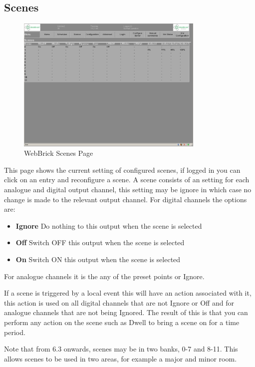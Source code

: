 \subsection{Scenes}
\begin{figure}[H]
\centering
\includegraphics[width=0.8\textwidth]{Images/Scenes.png}
\caption{WebBrick Scenes Page}
\end{figure}

This page shows the current setting of configured scenes, if logged in you can click on an entry and reconfigure a scene.
A scene consists of an setting for each analogue and digital output channel, this setting may be ignore in which case 
no change is made to the relevant output channel. For digital channels
the options are:

	\begin{itemize}
		\item{\bf Ignore} Do nothing to this output when the scene is selected
		\item{\bf Off} Switch OFF this output when the scene is selected
		\item{\bf On} Switch ON this output when the scene is selected
	\end{itemize}

For analogue channels it is the any of the preset points or Ignore. 

If a scene is triggered by a local event this will have an action associated with it, this action is used on all digital
channels that are not Ignore or Off and for analogue channels that are not being Ignored. The result of this is that
you can perform any action on the scene such as Dwell to bring a scene on for a time period.

Note that from 6.3 onwards, scenes may be in two banks, 0-7 and 8-11.  This allows scenes to be used in two areas, for example
a major and minor room.

